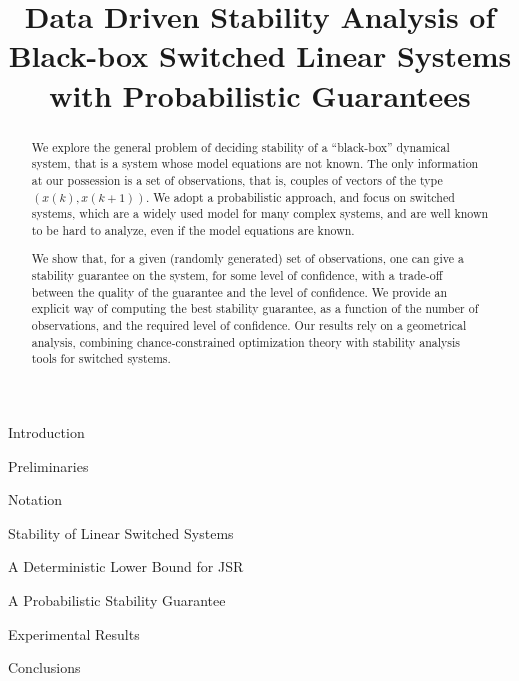 \documentclass[letterpaper, 10 pt, conference]{ieeeconf}
\title{Data Driven Stability Analysis of Black-box Switched Linear Systems \\with Probabilistic Guarantees}
\begin{document}
\maketitle

\begin{abstract}
We explore the general problem of deciding stability of a ``black-box'' dynamical system, that is a system whose model equations are not known. The only information at our possession is a set of observations, that is, couples of vectors of the type $(x(k), x(k+1)).$  We adopt a probabilistic approach, and focus on switched systems, which are a widely used model for many complex systems, and are well known to be hard to analyze, even if the model equations are known.

We show that, for a given (randomly generated) set of observations, one can give a stability guarantee on the system, for some level of confidence, with a trade-off between the quality of the guarantee and the level of confidence.  We provide an explicit way of computing the best stability guarantee, as a function of the number of observations, and the required level of confidence.  Our results rely on a geometrical analysis, combining chance-constrained optimization theory with stability analysis tools for switched systems.
\end{abstract}

\begin{section}{Introduction}

\end{section}

\begin{section}{Preliminaries}
\label{sec:preliminaries}
\begin{subsection}{Notation}
 
\end{subsection}
\begin{subsection}{Stability of Linear Switched Systems}

\end{subsection}
\end{section}

\begin{section}{A Deterministic Lower Bound for JSR}
\label{sec:lowerbound}

\end{section}

\begin{section}{A Probabilistic Stability Guarantee}
\label{sec:upperbound}



%
%
%
\end{section}

\begin{section}{Experimental Results}
\label{sec:experiments}

\end{section}

\begin{section}{Conclusions}
\label{sec:conclusions}

\end{section}

\appendix
\label{appendix}





\end{document}
